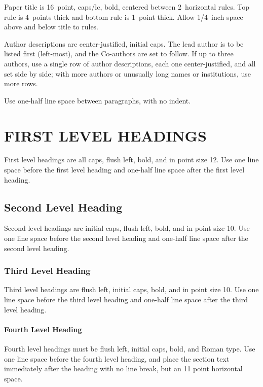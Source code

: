 \documentclass[twoside]{article}
\begin{document}
Paper title is 16~point, caps/lc, bold, centered between 2~horizontal rules.
Top rule is 4~points thick and bottom rule is 1~point thick.
Allow 1/4~inch space above and below title to rules.

Author descriptions are center-justified, initial caps.  The lead
author is to be listed first (left-most), and the Co-authors are set
to follow.  If up to three authors, use a single row of author
descriptions, each one center-justified, and all set side by side;
with more authors or unusually long names or institutions, use more
rows.

Use one-half line space between paragraphs, with no indent.

\section{FIRST LEVEL HEADINGS}

First level headings are all caps, flush left, bold, and in point size
12. Use one line space before the first level heading and one-half line space
after the first level heading.

\subsection{Second Level Heading}

Second level headings are initial caps, flush left, bold, and in point
size 10. Use one line space before the second level heading and one-half line
space after the second level heading.

\subsubsection{Third Level Heading}

Third level headings are flush left, initial caps, bold, and in point
size 10. Use one line space before the third level heading and one-half line
space after the third level heading.

\paragraph{Fourth Level Heading}

Fourth level headings must be flush left, initial caps, bold, and
Roman type.  Use one line space before the fourth level heading, and
place the section text immediately after the heading with no line
break, but an 11 point horizontal space.
\end{document}
